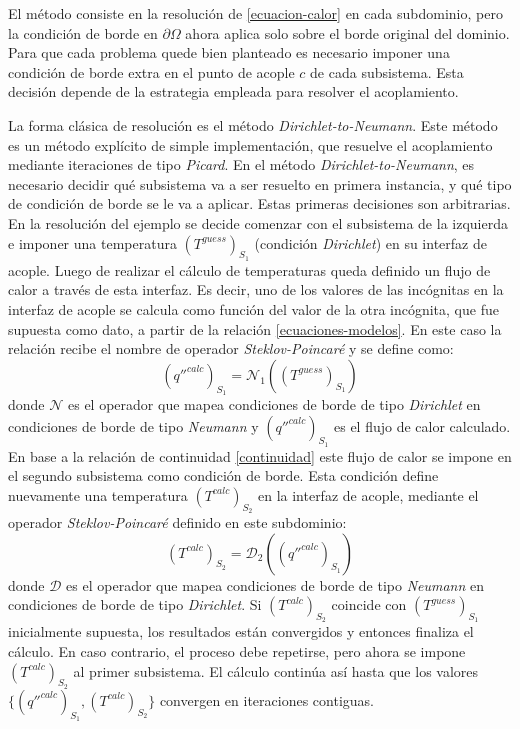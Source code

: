 El método consiste en la resolución de \ref{ecuacion-calor} en cada subdominio,
pero la condición de borde en $\partial \Omega$ ahora aplica solo sobre el borde original del dominio.
Para que cada problema quede bien planteado es necesario imponer una condición de borde extra en el punto de acople $c$ de cada subsistema.
Esta decisión depende de la estrategia empleada para resolver el acoplamiento.

La forma clásica de resolución es el método \textit{Dirichlet-to-Neumann}.
Este método es un método explícito de simple implementación, que resuelve el acoplamiento mediante iteraciones de tipo \textit{Picard}.
En el método \textit{Dirichlet-to-Neumann}, es necesario decidir qué subsistema va a ser resuelto en primera instancia,
y qué tipo de condición de borde se le va a aplicar.
Estas primeras decisiones son arbitrarias.
En la resolución del ejemplo se decide comenzar con el subsistema de la izquierda e
imponer una temperatura $(T^{guess})_{S_1}$ (condición \textit{Dirichlet}) en su interfaz de acople.
Luego de realizar el cálculo de temperaturas queda definido un flujo de calor a través de esta interfaz.
Es decir, uno de los valores de las incógnitas en la interfaz de acople se calcula como función del valor de la otra incógnita, 
que fue supuesta como dato, a partir de la relación \ref{ecuaciones-modelos}.
En este caso la relación recibe el nombre de operador \textit{Steklov-Poincaré} y se define como:
\begin{equation}
(q''^{calc})_{S_1} = \mathscr{N}_1\left ((T^{guess})_{S_1}\right )
\label{q_n_t}
\end{equation}
donde $\mathscr{N}$ es el operador que mapea condiciones de borde de tipo \textit{Dirichlet} en condiciones de borde de tipo \textit{Neumann}
y $(q''^{calc})_{S_1}$ es el flujo de calor calculado.
En base a la relación de continuidad \ref{continuidad} este flujo de calor se impone en el segundo subsistema como condición de borde.
Esta condición define nuevamente una temperatura $(T^{calc})_{S_2}$ en la interfaz de acople, mediante el operador \textit{Steklov-Poincaré} definido en este subdominio:
\begin{equation}
(T^{calc})_{S_2} = \mathscr{D}_2\left ((q''^{calc})_{S_1}\right )
\label{t_d_q}
\end{equation}
donde $\mathscr{D}$ es el operador que mapea condiciones de borde de tipo \textit{Neumann} en condiciones de borde de tipo \textit{Dirichlet}.
Si $(T^{calc})_{S_2}$ coincide con $(T^{guess})_{S_1}$ inicialmente supuesta,
los resultados están convergidos y entonces finaliza el cálculo.
En caso contrario, el proceso debe repetirse, pero ahora se impone $(T^{calc})_{S_2}$ al primer subsistema.
El cálculo continúa así hasta que los valores $\{(q''^{calc})_{S_1}, (T^{calc})_{S_2}\}$ convergen en iteraciones contiguas.


